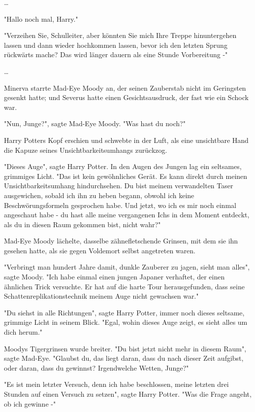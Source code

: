 {…

"Hallo noch mal, Harry."

"Verzeihen Sie, Schulleiter, aber könnten Sie mich Ihre Treppe hinuntergehen lassen und dann wieder hochkommen lassen, bevor ich den letzten Sprung rückwärts mache? Das wird länger dauern als eine Stunde Vorbereitung -"

…

Minerva starrte Mad-Eye Moody an, der seinen Zauberstab nicht im Geringsten gesenkt hatte; und Severus hatte einen Gesichtsausdruck, der fast wie ein Schock war.

"Nun, Junge?", sagte Mad-Eye Moody. "Was hast du noch?"

Harry Potters Kopf erschien und schwebte in der Luft, als eine unsichtbare Hand die Kapuze seines Unsichtbarkeitsumhangs zurückzog.

"Dieses Auge", sagte Harry Potter. In den Augen des Jungen lag ein seltsames, grimmiges Licht. "Das ist kein gewöhnliches Gerät. Es kann direkt durch meinen Unsichtbarkeitsumhang hindurchsehen. Du bist meinem verwandelten Taser ausgewichen, sobald ich ihn zu heben begann, obwohl ich keine Beschwörungsformeln gesprochen habe. Und jetzt, wo ich es mir noch einmal angeschaut habe - du hast alle meine vergangenen Ichs in dem Moment entdeckt, als du in diesen Raum gekommen bist, nicht wahr?"

Mad-Eye Moody lächelte, dasselbe zähnefletschende Grinsen, mit dem sie ihn gesehen hatte, als sie gegen Voldemort selbst angetreten waren.

"Verbringt man hundert Jahre damit, dunkle Zauberer zu jagen, sieht man alles", sagte Moody. "Ich habe einmal einen jungen Japaner verhaftet, der einen ähnlichen Trick versuchte. Er hat auf die harte Tour herausgefunden, dass seine Schattenreplikationstechnik meinem Auge nicht gewachsen war."

"Du siehst in alle Richtungen", sagte Harry Potter, immer noch dieses seltsame, grimmige Licht in seinem Blick. "Egal, wohin dieses Auge zeigt, es sieht alles um dich herum."

Moodys Tigergrinsen wurde breiter. "Du bist jetzt nicht mehr in diesem Raum", sagte Mad-Eye. "Glaubst du, das liegt daran, dass du nach dieser Zeit aufgibst, oder daran, dass du gewinnst? Irgendwelche Wetten, Junge?"

"Es ist mein letzter Versuch, denn ich habe beschlossen, meine letzten drei Stunden auf einen Versuch zu setzen", sagte Harry Potter. "Was die Frage angeht, ob ich gewinne -"

}
